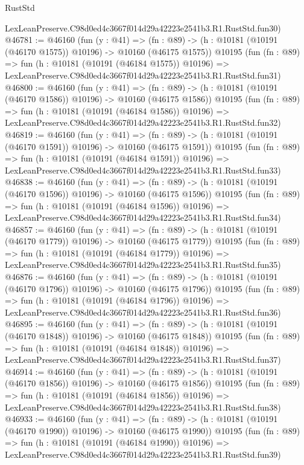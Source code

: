\begin{lexlean}{RustStd}
\begin{coremodule}
    LexLeanPreserve.C98d0ed4c3667f014d29a42223e2541b3.R1.RustStd.fun30)
@46781 := @46160
    (fun (y : @41) =>
    (fn : @89) -> (h : @10181 (@10191 (@46170 @1575)) @10196) -> @10160 (@46175 @1575))
    @10195
    (fun (fn : @89) =>
    fun (h : @10181 (@10191 (@46184 @1575)) @10196) =>
    LexLeanPreserve.C98d0ed4c3667f014d29a42223e2541b3.R1.RustStd.fun31)
@46800 := @46160
    (fun (y : @41) =>
    (fn : @89) -> (h : @10181 (@10191 (@46170 @1586)) @10196) -> @10160 (@46175 @1586))
    @10195
    (fun (fn : @89) =>
    fun (h : @10181 (@10191 (@46184 @1586)) @10196) =>
    LexLeanPreserve.C98d0ed4c3667f014d29a42223e2541b3.R1.RustStd.fun32)
@46819 := @46160
    (fun (y : @41) =>
    (fn : @89) -> (h : @10181 (@10191 (@46170 @1591)) @10196) -> @10160 (@46175 @1591))
    @10195
    (fun (fn : @89) =>
    fun (h : @10181 (@10191 (@46184 @1591)) @10196) =>
    LexLeanPreserve.C98d0ed4c3667f014d29a42223e2541b3.R1.RustStd.fun33)
@46838 := @46160
    (fun (y : @41) =>
    (fn : @89) -> (h : @10181 (@10191 (@46170 @1596)) @10196) -> @10160 (@46175 @1596))
    @10195
    (fun (fn : @89) =>
    fun (h : @10181 (@10191 (@46184 @1596)) @10196) =>
    LexLeanPreserve.C98d0ed4c3667f014d29a42223e2541b3.R1.RustStd.fun34)
@46857 := @46160
    (fun (y : @41) =>
    (fn : @89) -> (h : @10181 (@10191 (@46170 @1779)) @10196) -> @10160 (@46175 @1779))
    @10195
    (fun (fn : @89) =>
    fun (h : @10181 (@10191 (@46184 @1779)) @10196) =>
    LexLeanPreserve.C98d0ed4c3667f014d29a42223e2541b3.R1.RustStd.fun35)
@46876 := @46160
    (fun (y : @41) =>
    (fn : @89) -> (h : @10181 (@10191 (@46170 @1796)) @10196) -> @10160 (@46175 @1796))
    @10195
    (fun (fn : @89) =>
    fun (h : @10181 (@10191 (@46184 @1796)) @10196) =>
    LexLeanPreserve.C98d0ed4c3667f014d29a42223e2541b3.R1.RustStd.fun36)
@46895 := @46160
    (fun (y : @41) =>
    (fn : @89) -> (h : @10181 (@10191 (@46170 @1848)) @10196) -> @10160 (@46175 @1848))
    @10195
    (fun (fn : @89) =>
    fun (h : @10181 (@10191 (@46184 @1848)) @10196) =>
    LexLeanPreserve.C98d0ed4c3667f014d29a42223e2541b3.R1.RustStd.fun37)
@46914 := @46160
    (fun (y : @41) =>
    (fn : @89) -> (h : @10181 (@10191 (@46170 @1856)) @10196) -> @10160 (@46175 @1856))
    @10195
    (fun (fn : @89) =>
    fun (h : @10181 (@10191 (@46184 @1856)) @10196) =>
    LexLeanPreserve.C98d0ed4c3667f014d29a42223e2541b3.R1.RustStd.fun38)
@46933 := @46160
    (fun (y : @41) =>
    (fn : @89) -> (h : @10181 (@10191 (@46170 @1990)) @10196) -> @10160 (@46175 @1990))
    @10195
    (fun (fn : @89) =>
    fun (h : @10181 (@10191 (@46184 @1990)) @10196) =>
    LexLeanPreserve.C98d0ed4c3667f014d29a42223e2541b3.R1.RustStd.fun39)

\end{coremodule}
\end{lexlean}
